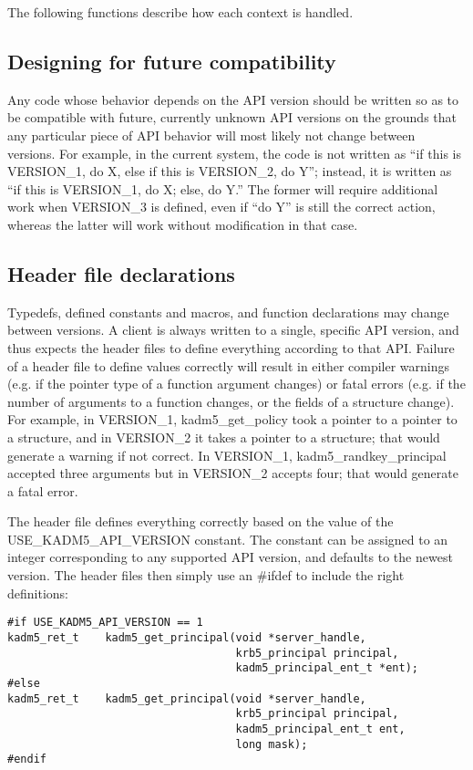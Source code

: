 The following functions describe how each context is handled.

\subsection{Designing for future compatibility}

Any code whose behavior depends on the API version should be written
so as to be compatible with future, currently unknown API versions on
the grounds that any particular piece of API behavior will most
likely not change between versions.  For example, in the current
system, the code is not written as ``if this is VERSION_1, do X, else
if this is VERSION_2, do Y''; instead, it is written as ``if this is
VERSION_1, do X; else, do Y.''  The former will require additional
work when VERSION_3 is defined, even if ``do Y'' is still the correct
action, whereas the latter will work without modification in that
case.

\subsection{Header file declarations}

Typedefs, defined constants and macros, and function declarations may
change between versions.  A client is always written to a single,
specific API version, and thus expects the header files to define
everything according to that API.  Failure of a header file to define
values correctly will result in either compiler warnings (e.g. if the
pointer type of a function argument changes) or fatal errors (e.g. if
the number of arguments to a function changes, or the fields of a
structure change).  For example, in VERSION_1, kadm5_get_policy took a
pointer to a pointer to a structure, and in VERSION_2 it takes a
pointer to a structure; that would generate a warning if not correct.
In VERSION_1, kadm5_randkey_principal accepted three arguments but in
VERSION_2 accepts four; that would generate a fatal error.

The header file defines everything correctly based on the value of the
USE_KADM5_API_VERSION constant.  The constant can be assigned to an
integer corresponding to any supported API version, and defaults to
the newest version.  The header files then simply use an \#ifdef to
include the right definitions:
%
\begin{verbatim}
#if USE_KADM5_API_VERSION == 1
kadm5_ret_t    kadm5_get_principal(void *server_handle,
                                   krb5_principal principal,
                                   kadm5_principal_ent_t *ent);
#else
kadm5_ret_t    kadm5_get_principal(void *server_handle,
                                   krb5_principal principal,
                                   kadm5_principal_ent_t ent,
                                   long mask);
#endif
\end{verbatim}

